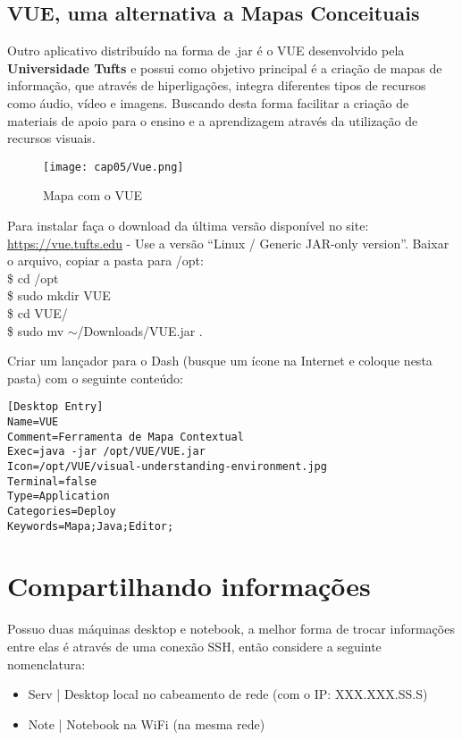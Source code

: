\subsection{VUE, uma alternativa a Mapas Conceituais}
Outro aplicativo distribuído na forma de .jar é o VUE desenvolvido pela \textbf{Universidade Tufts} e possui como objetivo principal é a criação de mapas de informação, que através de hiperligações, integra diferentes tipos de recursos como áudio, vídeo e imagens. Buscando desta forma facilitar a criação de materiais de apoio para o ensino e a aprendizagem através da utilização de recursos visuais.
\begin{figure}[H]
\centering\texttt{[image: cap05/Vue.png]}
\caption{Mapa com o VUE}
\end{figure}

Para instalar faça o download da última versão disponível no site: \url{https://vue.tufts.edu} - Use a versão ``Linux / Generic JAR-only version''. Baixar o arquivo, copiar a pasta para /opt: \\
{\ttfamily\$ cd /opt \\
\$ sudo mkdir VUE \\
\$ cd VUE/ \\
\$ sudo mv $\sim$/Downloads/VUE.jar .}

Criar um lançador para o Dash (busque um ícone na Internet e coloque nesta pasta) com o seguinte conteúdo:
\begin{lstlisting}
[Desktop Entry]
Name=VUE
Comment=Ferramenta de Mapa Contextual
Exec=java -jar /opt/VUE/VUE.jar
Icon=/opt/VUE/visual-understanding-environment.jpg
Terminal=false
Type=Application
Categories=Deploy
Keywords=Mapa;Java;Editor;
\end{lstlisting}

\section{Compartilhando informações}
Possuo duas máquinas desktop e notebook, a melhor forma de trocar informações entre elas é através de uma conexão SSH, então considere a seguinte nomenclatura: \vspace{-1em}
\begin{itemize}[noitemsep]
 \item Serv | Desktop local no cabeamento de rede (com o IP: XXX.XXX.SS.S) 
 \item Note | Notebook na WiFi (na mesma rede)
\end{itemize}

